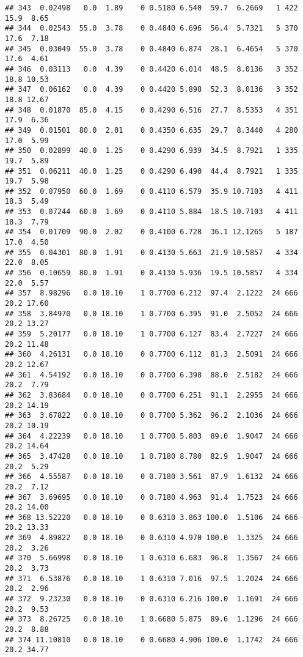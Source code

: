 \documentclass[
]{article}
\begin{document}
\begin{verbatim}
## 343  0.02498   0.0  1.89    0 0.5180 6.540  59.7  6.2669   1 422    15.9  8.65
## 344  0.02543  55.0  3.78    0 0.4840 6.696  56.4  5.7321   5 370    17.6  7.18
## 345  0.03049  55.0  3.78    0 0.4840 6.874  28.1  6.4654   5 370    17.6  4.61
## 346  0.03113   0.0  4.39    0 0.4420 6.014  48.5  8.0136   3 352    18.8 10.53
## 347  0.06162   0.0  4.39    0 0.4420 5.898  52.3  8.0136   3 352    18.8 12.67
## 348  0.01870  85.0  4.15    0 0.4290 6.516  27.7  8.5353   4 351    17.9  6.36
## 349  0.01501  80.0  2.01    0 0.4350 6.635  29.7  8.3440   4 280    17.0  5.99
## 350  0.02899  40.0  1.25    0 0.4290 6.939  34.5  8.7921   1 335    19.7  5.89
## 351  0.06211  40.0  1.25    0 0.4290 6.490  44.4  8.7921   1 335    19.7  5.98
## 352  0.07950  60.0  1.69    0 0.4110 6.579  35.9 10.7103   4 411    18.3  5.49
## 353  0.07244  60.0  1.69    0 0.4110 5.884  18.5 10.7103   4 411    18.3  7.79
## 354  0.01709  90.0  2.02    0 0.4100 6.728  36.1 12.1265   5 187    17.0  4.50
## 355  0.04301  80.0  1.91    0 0.4130 5.663  21.9 10.5857   4 334    22.0  8.05
## 356  0.10659  80.0  1.91    0 0.4130 5.936  19.5 10.5857   4 334    22.0  5.57
## 357  8.98296   0.0 18.10    1 0.7700 6.212  97.4  2.1222  24 666    20.2 17.60
## 358  3.84970   0.0 18.10    1 0.7700 6.395  91.0  2.5052  24 666    20.2 13.27
## 359  5.20177   0.0 18.10    1 0.7700 6.127  83.4  2.7227  24 666    20.2 11.48
## 360  4.26131   0.0 18.10    0 0.7700 6.112  81.3  2.5091  24 666    20.2 12.67
## 361  4.54192   0.0 18.10    0 0.7700 6.398  88.0  2.5182  24 666    20.2  7.79
## 362  3.83684   0.0 18.10    0 0.7700 6.251  91.1  2.2955  24 666    20.2 14.19
## 363  3.67822   0.0 18.10    0 0.7700 5.362  96.2  2.1036  24 666    20.2 10.19
## 364  4.22239   0.0 18.10    1 0.7700 5.803  89.0  1.9047  24 666    20.2 14.64
## 365  3.47428   0.0 18.10    1 0.7180 8.780  82.9  1.9047  24 666    20.2  5.29
## 366  4.55587   0.0 18.10    0 0.7180 3.561  87.9  1.6132  24 666    20.2  7.12
## 367  3.69695   0.0 18.10    0 0.7180 4.963  91.4  1.7523  24 666    20.2 14.00
## 368 13.52220   0.0 18.10    0 0.6310 3.863 100.0  1.5106  24 666    20.2 13.33
## 369  4.89822   0.0 18.10    0 0.6310 4.970 100.0  1.3325  24 666    20.2  3.26
## 370  5.66998   0.0 18.10    1 0.6310 6.683  96.8  1.3567  24 666    20.2  3.73
## 371  6.53876   0.0 18.10    1 0.6310 7.016  97.5  1.2024  24 666    20.2  2.96
## 372  9.23230   0.0 18.10    0 0.6310 6.216 100.0  1.1691  24 666    20.2  9.53
## 373  8.26725   0.0 18.10    1 0.6680 5.875  89.6  1.1296  24 666    20.2  8.88
## 374 11.10810   0.0 18.10    0 0.6680 4.906 100.0  1.1742  24 666    20.2 34.77

\end{verbatim}
\end{document}
